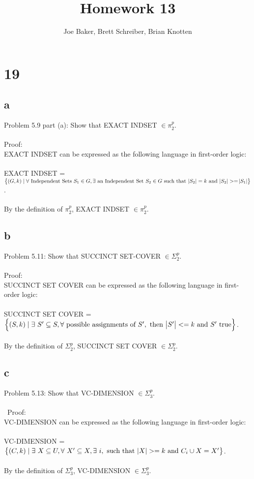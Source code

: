 \documentclass[letterpaper,notitlepage,twoside]{article}
\begin{document}
\title{Homework 13}
\author{Joe Baker, Brett Schreiber, Brian Knotten}
\maketitle

\section*{19}

\subsection*{a}
Problem 5.9 part (a): Show that EXACT INDSET $\in \pi_2^p$.
\\\\
Proof:\\
EXACT INDSET can be expressed as the following language in first-order logic:\\\\
EXACT INDSET = $\left\{ \left( G, k \right) \mid \forall \text{ Independent Sets } S_1 \in G,  \exists \text{ an Independent Set } S_2 \in G \text{ such that } \abs{S_2} = k \text{ and } \abs{S_2} >= \abs{S_1} \right\}$.\\\\
By the definition of $\pi_2^p$, EXACT INDSET $\in \pi_2^p$.

\subsection*{b}
Problem 5.11: Show that SUCCINCT SET-COVER $\in \Sigma_2^p$.
\\\\
Proof:\\
SUCCINCT SET COVER can be expressed as the following language in first-order logic:\\\\
SUCCINCT SET COVER = $\left\{ \left( S, k \right) \mid \exists \text{ } S' \subseteq S, \forall \text{ possible assignments of } S', \text{ then } \abs{S'} <= k \text{ and } S' \text{ true} \right\}$.\\\\
By the definition of $\Sigma_2^p$, SUCCINCT SET COVER $\in \Sigma_2^p$.

\subsection*{c}
Problem 5.13: Show that VC-DIMENSION $\in \Sigma_3^p$.
\\\\\
Proof:\\
VC-DIMENSION can be expressed as the following language in first-order logic:\\\\
VC-DIMENSION = $\left\{ \left( C, k \right) \mid \exists \text{ } X \subseteq U, \forall \text{ } X' \subseteq X, \exists \text{ } i, \text{ such that } \abs{X} >= k \text{ and } C_i \cup X = X' \right\}$.\\\\
By the definition of $\Sigma_3^p$, VC-DIMENSION $\in \Sigma_3^p$.
\end{document}
